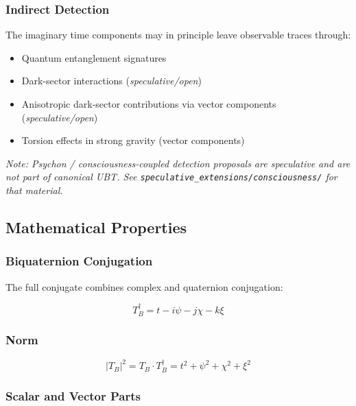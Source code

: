 \subsubsection{Indirect Detection}

The imaginary time components may in principle leave observable traces through:
\begin{itemize}
    \item Quantum entanglement signatures
    \item Dark-sector interactions (\textit{speculative/open})
    \item Anisotropic dark-sector contributions via vector components (\textit{speculative/open})
    \item Torsion effects in strong gravity (vector components)
\end{itemize}

\textit{Note: Psychon / consciousness-coupled detection proposals are speculative and are not
part of canonical UBT\@.  See \texttt{speculative\_extensions/consciousness/} for that material.}

\subsection{Mathematical Properties}

\subsubsection{Biquaternion Conjugation}

The full conjugate combines complex and quaternion conjugation:

\begin{equation}
\label{eq:canonical:tb_conjugate}
T_B^\dagger = t - i\psi - j\chi - k\xi
\end{equation}

\subsubsection{Norm}

\begin{equation}
\label{eq:canonical:tb_norm}
|T_B|^2 = T_B \cdot T_B^\dagger = t^2 + \psi^2 + \chi^2 + \xi^2
\end{equation}

\subsubsection{Scalar and Vector Parts}

